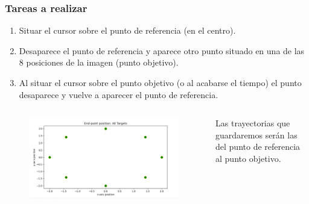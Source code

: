 \documentclass[pdf]{beamer}
\begin{document}
\begin{frame}
	\frametitle{Tareas a realizar}

	\begin{enumerate}
		\item Situar el cursor sobre el punto de referencia (en el centro).
		\item Desaparece el punto de referencia y aparece otro punto situado en una de las 8 posiciones de la imagen (punto objetivo). 
		\item Al situar el cursor sobre el punto objetivo (o al acabarse el tiempo) el punto desaparece y vuelve a aparecer el punto de referencia.
	\end{enumerate}
\begin{columns}
	\begin{column}{0.5\textwidth}
	\begin{figure}
	\centering
	\includegraphics[width=\textwidth]{points}
\end{figure}	
\end{column}
\begin{column}{0.5\textwidth}
\begin{block}{}
	{\small Las trayectorias que guardaremos serán las del punto de referencia al punto objetivo.}
\end{block}	
\end{column}
\end{columns}

\end{frame}
\end{document}
